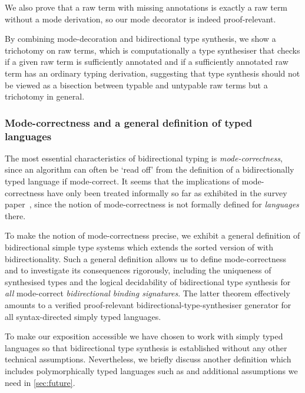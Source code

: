 We also prove that a raw term with missing annotations is exactly a raw term without a mode derivation, so our mode decorator is indeed proof-relevant.

By combining mode-decoration and bidirectional type synthesis, we show a trichotomy on raw terms, which is computationally a type synthesiser that checks if a given raw term is sufficiently annotated and if a sufficiently annotated raw term has an ordinary typing derivation, suggesting that type synthesis should not be viewed as a bisection between typable and untypable raw terms but a trichotomy in general.

\subsubsection{Mode-correctness and a general definition of typed languages}
\label{sec:language-formalisation}
The most essential characteristics of bidirectional typing is \emph{mode-correctness}, since an algorithm can often be `read off' from the definition of a bidirectionally typed language if mode-correct.
It seems that the implications of mode-correctness have only been treated informally so far as exhibited in the survey paper~\cite{Dunfield2021}, since the notion of mode-correctness is not formally defined for \emph{languages} there.

To make the notion of mode-correctness precise, we exhibit a general definition of bidirectional simple type systems which extends the sorted version of  with bidirectionality.
Such a general definition allows us to define mode-correctness and to investigate its consequences rigorously, including the uniqueness of synthesised types and the logical decidability of bidirectional type synthesis for \emph{all} mode-correct \emph{bidirectional binding signatures}.
The latter theorem effectively amounts to a verified proof-relevant bidirectional-type-synthesiser generator for all syntax-directed simply typed languages.


To make our exposition accessible we have chosen to work with simply typed languages so that bidirectional type synthesis is established without any other technical assumptions.
Nevertheless, we briefly discuss another definition which includes polymorphically typed languages such as \SystemF and additional assumptions we need in \cref{sec:future}.

